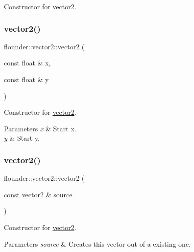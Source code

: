 Constructor for \hyperlink{classflounder_1_1vector2}{vector2}. 

\mbox{\label{classflounder_1_1vector2_aa15bf8af059379616c8bc98ab425c890}} 
\subsubsection{\texorpdfstring{vector2()}{vector2()}\hspace{0.1cm}{\footnotesize\ttfamily [2/3]}}
{\footnotesize\ttfamily flounder\+::vector2\+::vector2 (\begin{DoxyParamCaption}\item[{const float \&}]{x,  }\item[{const float \&}]{y }\end{DoxyParamCaption})}



Constructor for \hyperlink{classflounder_1_1vector2}{vector2}. 


\begin{DoxyParams}{Parameters}
{\em x} & Start x. \\
\hline
{\em y} & Start y. \\
\hline
\end{DoxyParams}
\mbox{\label{classflounder_1_1vector2_a7eb96dd51870fa69b53d293bdabfe1ac}} 
\subsubsection{\texorpdfstring{vector2()}{vector2()}\hspace{0.1cm}{\footnotesize\ttfamily [3/3]}}
{\footnotesize\ttfamily flounder\+::vector2\+::vector2 (\begin{DoxyParamCaption}\item[{const \hyperlink{classflounder_1_1vector2}{vector2} \&}]{source }\end{DoxyParamCaption})}



Constructor for \hyperlink{classflounder_1_1vector2}{vector2}. 


\begin{DoxyParams}{Parameters}
{\em source} & Creates this vector out of a existing one. \\
\hline
\end{DoxyParams}
\mbox{\label{classflounder_1_1vector2_a3bd2a39809e616ae35bc0de0079894af}} 
